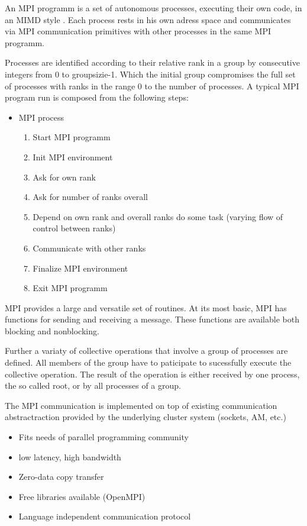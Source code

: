 An MPI programm is a set of autonomous processes, executing their own
code, in an MIMD style \cite{Flynn:1972:COE:1952456.1952459}. Each
process rests in his own adress space and communicates via MPI
communication primitives with other processes in the same MPI
programm. 

Processes are identified according to their relative rank in a group by
consecutive integers from 0 to groupsizie-1. Which the initial group
compromises the full set of processes with ranks in the range 0 to 
the number of processes. A typical MPI program run is composed from
the following steps:

\begin{itemize}
  \item MPI process
    \begin{enumerate}
      \item Start MPI programm
      \item Init MPI environment
      \item Ask for own rank
      \item Ask for number of ranks overall
      \item Depend on own rank and overall ranks do some task (varying flow of control between ranks)
      \item Communicate with other ranks
      \item Finalize MPI environment
      \item Exit MPI programm
    \end{enumerate}
\end{itemize}

MPI provides a large and versatile set of routines. At its most
basic, MPI has functions for sending and receiving a message.
These functions are available both blocking and nonblocking.

Further a variaty of collective operations that involve
a group of processes are defined. All members of the group
have to paticipate to sucessfully execute the collective operation.
The result of the operation is either received by one process,
the so called root, or by all processes of a group.

The MPI communication is implemented on top of existing communication
abstractraction provided by the underlying cluster system (sockets, AM, etc.)

\begin{itemize}
\item Fits needs of parallel programming community
\item low latency, high bandwidth
\item Zero-data copy transfer
\item Free libraries available (OpenMPI)
\item Language independent communication protocol
\end{itemize}

